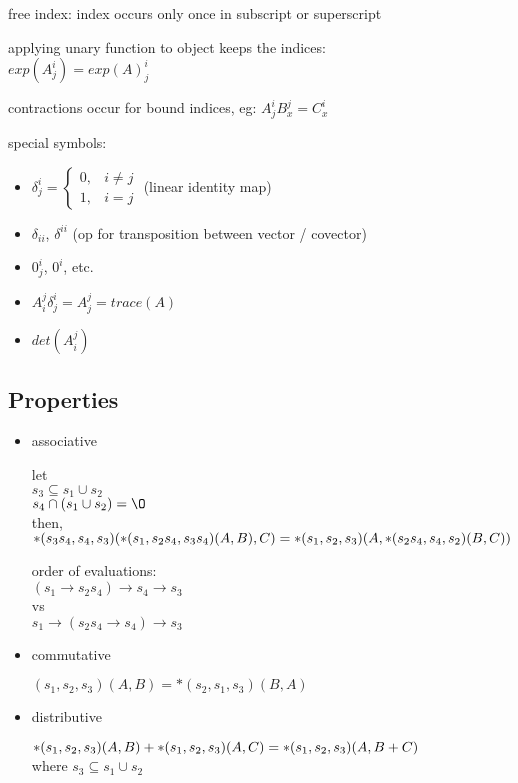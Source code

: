 \documentclass[8pt]{extarticle}
\begin{document}
\begin{multicols*}{2}
  free index: index occurs only once in subscript or superscript
    
  applying unary function to object keeps the indices:\\
  $exp(A^i_j) = exp(A)^i_j$

  contractions occur for bound indices, eg: $A^i_j B^j_x = C^i_x$
  
  special symbols:
  \begin{itemize}
  \item
    $\delta^i_j = \begin{cases}
    0, & i \neq j\\
    1, & i = j
                  \end{cases}$ (linear identity map)
  \item $\delta_{ii}$, $\delta^{ii}$ (op for transposition between vector / covector)
  \item $0^i_j$, $0^i$, etc.
  \item $A^j_i \delta^i_j = A^j_j = trace(A)$
  \item $det(A^j_i)$
  \end{itemize}
  
  \subsection{Properties}

  \begin{itemize}
  \item associative
    
    let\\
    $ s_3 \subseteq s_1 \cup s_2$\\
    $s_4 \cap (s_1 \cup s_2) = \O$\\
    then,\\
    $*(s_3 s_4, s_4, s_3)(*(s_1, s_2 s_4, s_3 s_4)(A,B), C)\\
    =*(s_1, s_2, s_3)(A, *(s_2 s_4, s_4, s_2)(B,C))$

    order of evaluations:\\
    $(s_1 \rightarrow s_2 s_4) \rightarrow s_4 \rightarrow s_3$\\
    vs\\
    $s_1 \rightarrow (s_2 s_4 \rightarrow s_4) \rightarrow s_3$
  \item commutative

    $(s_1,s_2,s_3)(A,B) = *(s_2,s_1,s_3)(B,A)$
  \item distributive

    $*(s_1,s_2,s_3)(A,B) + *(s_1,s_2,s_3)(A,C)\\= *(s_1,s_2,s_3)(A, B+C)$\\
    where $s_3 \subseteq s_1 \cup s_2$
  \end{itemize}


\end{multicols*}
\end{document}
